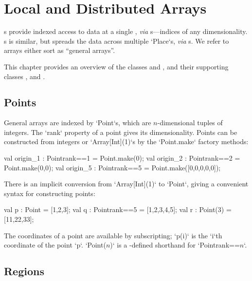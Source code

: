 \chapter{Local and Distributed Arrays}\label{XtenArrays}

s provide indexed access to data at a single , {\em via}
s---indices of any dimensionality. s is similar, but
spreads the data across multiple \xcd`Place`s, {\em via} s.  
We refer to arrays either sort as ``general arrays''.  


This chapter provides an overview of the  classes 
and , and their supporting classes , 
and .  


\section{Points}\label{point-syntax}


General arrays are indexed by \xcd`Point`s, which are $n$-dimensional tuples of
integers.  The \xcd`rank`
property of a point gives its dimensionality.  Points can be constructed from
integers or \xcd`Array[Int](1)`s by
the \xcd`Point.make` factory methods:
\begin{xten}
val origin_1 : Point{rank==1} = Point.make(0);
val origin_2 : Point{rank==2} = Point.make(0,0);
val origin_5 : Point{rank==5} = Point.make([0,0,0,0,0]);
\end{xten}

There is an implicit conversion from \xcd`Array[Int](1)` to 
\xcd`Point`, giving
a convenient syntax for constructing points: 

\begin{xten}
val p : Point = [1,2,3];
val q : Point{rank==5} = [1,2,3,4,5];
val r : Point(3) = [11,22,33];
\end{xten}

The coordinates of a point are available by subscripting; \xcd`p(i)` is the
\xcd`i`th coordinate of the point \xcd`p`. 
\xcdmath`Point($n$)` is a -defined shorthand  for 
\xcdmath`Point{rank==$n$}`.


\section{Regions}\label{XtenRegions}

